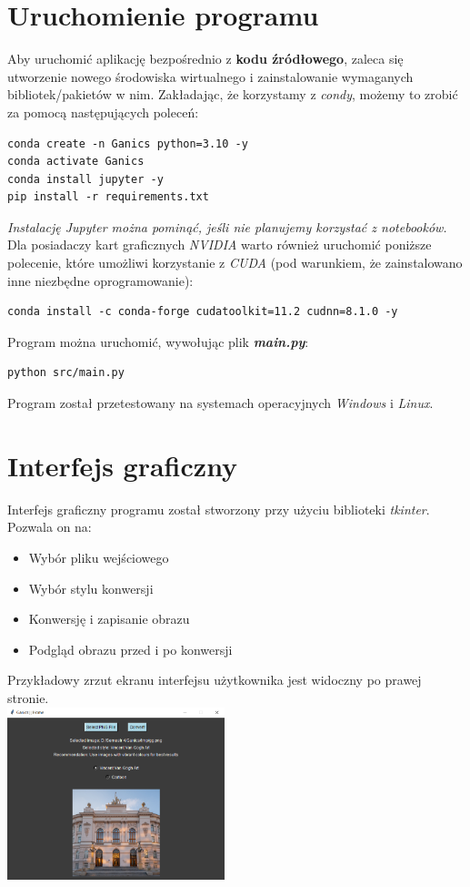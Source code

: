 \documentclass{article}
\begin{document}
\section{Uruchomienie programu}
Aby uruchomić aplikację bezpośrednio z \textbf{kodu źródłowego}, zaleca się utworzenie nowego środowiska wirtualnego i zainstalowanie wymaganych bibliotek/pakietów w nim.
Zakładając, że korzystamy z \textit{condy}, możemy to zrobić za pomocą następujących poleceń:
\begin{verbatim}
conda create -n Ganics python=3.10 -y
conda activate Ganics
conda install jupyter -y
pip install -r requirements.txt
\end{verbatim}
\textit{Instalację Jupyter można pominąć, jeśli nie planujemy korzystać z notebooków.}
\vspace{3mm} \\
Dla posiadaczy kart graficznych \textit{NVIDIA} warto również uruchomić poniższe polecenie, które umożliwi korzystanie z \textit{CUDA} (pod warunkiem, że zainstalowano inne niezbędne oprogramowanie):
\begin{verbatim}
conda install -c conda-forge cudatoolkit=11.2 cudnn=8.1.0 -y
\end{verbatim}
Program można uruchomić, wywołując plik \textbf{\textit{main.py}}:
\begin{verbatim}
python src/main.py
\end{verbatim}
Program został przetestowany na systemach operacyjnych \textit{Windows} i \textit{Linux}.

\section{Interfejs graficzny}
\begin{multicols}{2}
Interfejs graficzny programu został stworzony przy użyciu biblioteki \textit{tkinter}. Pozwala on na:
\begin{itemize}
    \setlength\itemsep{0pt}
    \item Wybór pliku wejściowego
    \item Wybór stylu konwersji
    \item Konwersję i zapisanie obrazu
    \item Podgląd obrazu przed i po konwersji
\end{itemize}
Przykładowy zrzut ekranu interfejsu użytkownika jest widoczny po prawej stronie.
\vspace{5\baselineskip} \\
\columnbreak
\includegraphics[width=0.475\textwidth]{../imgs/gui.png}
\end{multicols}
\end{document}
